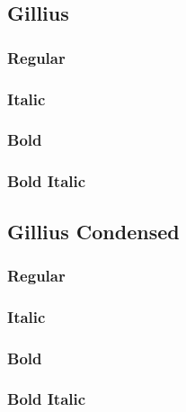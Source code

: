 \documentclass{article}
\begin{document}
\enlargethispage*{4ex}

\subsection*{Gillius}
\subsubsection*{Regular}
\lipsum[1]

\subsubsection*{Italic}
\textit{\lipsum[2]}

\subsubsection*{Bold}

\textbf{\lipsum[3]}


\subsubsection*{Bold Italic}

\textbf{\textit{\lipsum[4]}}

\subsection*{Gillius Condensed}

\gilliuscondensed


\subsubsection*{Regular}
\lipsum[1]

\subsubsection*{Italic}
\textit{\lipsum[2]}

\subsubsection*{Bold}

\textbf{\lipsum[3]}



\subsubsection*{Bold Italic}

\textbf{\textit{\lipsum[4]}}
\end{document}
